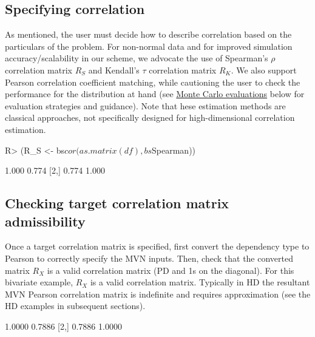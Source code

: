 \documentclass[
]{jss}
\begin{document}
\hypertarget{specifying-correlation}{%
\subsection{Specifying correlation}\label{specifying-correlation}}

As mentioned, the user must decide how to describe correlation based on
the particulars of the problem. For non-normal data and for improved
simulation accuracy/scalability in our scheme, we advocate the use of
Spearman's \(\rho\) correlation matrix \(R_S\) and Kendall's \(\tau\)
correlation matrix \(R_K\). We also support Pearson correlation
coefficient matching, while cautioning the user to check the performance
for the distribution at hand (see \protect\hyperlink{simulations}{Monte
Carlo evaluations} below for evaluation strategies and guidance). Note
that hese estimation methods are classical approaches, not specifically
designed for high-dimensional correlation estimation.

\begin{CodeChunk}
\begin{CodeInput}
R> (R_S <- bs$cor(as.matrix(df), bs$Spearman))
\end{CodeInput}
\begin{CodeOutput}
      [,1]  [,2]
[1,] 1.000 0.774
[2,] 0.774 1.000
\end{CodeOutput}
\end{CodeChunk}

\hypertarget{checking-target-correlation-matrix-admissibility}{%
\subsection{Checking target correlation matrix
admissibility}\label{checking-target-correlation-matrix-admissibility}}

Once a target correlation matrix is specified, first convert the
dependency type to Pearson to correctly specify the MVN inputs. Then,
check that the converted matrix \(R_X\) is a valid correlation matrix
(PD and 1s on the diagonal). For this bivariate example, \(R_X\) is a
valid correlation matrix. Typically in HD the resultant MVN Pearson
correlation matrix is indefinite and requires approximation (see the HD
examples in subsequent sections).

\begin{CodeChunk}
\begin{CodeOutput}
       [,1]   [,2]
[1,] 1.0000 0.7886
[2,] 0.7886 1.0000
\end{CodeOutput}
\end{CodeChunk}
\end{document}
